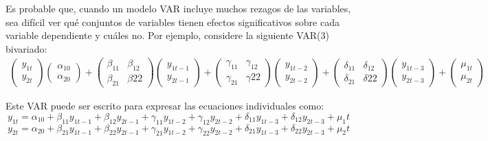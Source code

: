 	
	Es probable que, cuando un modelo VAR incluye muchos rezagos de las variables, sea dif\'{i}cil ver qu\'e conjuntos de variables tienen efectos significativos sobre cada variable dependiente y cu\'ales no. Por ejemplo, considere la siguiente VAR(3) bivariado:
	\scriptsize
	\begin{gather*}
	\begin{pmatrix} y_{1t} \\ y_{2t} \end{pmatrix}
	\begin{pmatrix} \alpha_{10} \\ \alpha_{20} \end{pmatrix}
	+
	\begin{pmatrix} \beta_{11} & \beta_{12} \\ \beta_{21} & \beta{22} \end{pmatrix}
	\begin{pmatrix} y_{1t-1} \\ y_{2t-1} \end{pmatrix}
	+
	\begin{pmatrix} \gamma_{11} & \gamma_{12} \\ \gamma_{21} & \gamma{22} \end{pmatrix}
	\begin{pmatrix} y_{1t-2} \\ y_{2t-2} \end{pmatrix}
	+
	\begin{pmatrix} \delta_{11} & \delta_{12} \\ \delta_{21} & \delta{22} \end{pmatrix}
	\begin{pmatrix} y_{1t-3} \\ y_{2t-3} \end{pmatrix}
	+
	\begin{pmatrix} \mu_{1t} \\ \mu_{2t} \end{pmatrix}
	\end{gather*}
	
	
	Este VAR puede ser escrito para expresar las ecuaciones individuales como:
	\footnotesize
	\begin{equation*}
	y_{1t} = \alpha_{10} + \beta_{11} y_{1t-1} + \beta_{12} y_{2t-1} + \gamma_{11} y_{1t-2} + \gamma_{12} y_{2t-2} + \delta_{11} y_{1t-3} + \delta_{12} y_{2t-3} + \mu_1t
	\end{equation*}
	\begin{equation*}
	y_{2t} = \alpha_{20} + \beta_{21} y_{1t-1} + \beta_{22} y_{2t-1} + \gamma_{21} y_{1t-2} +\gamma_{22} y_{2t-2} + \delta_{21} y_{1t-3} + \delta_{22} y_{2t-3} + \mu_2t
	\end{equation*}
	
